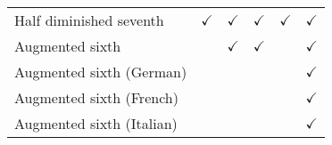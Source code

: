 \begin{tabular}{llllll}
Half diminished seventh   & $\checkmark$      & $\checkmark$                        & $\checkmark$                        & $\checkmark$                           & $\checkmark$                 \\
Augmented sixth           &         & $\checkmark$                        & $\checkmark$                        &                              &        $\checkmark$            \\
Augmented sixth (German)  &         &                           &                           &                              & $\checkmark$                 \\
Augmented sixth (French)  &         &                           &                           &                              & $\checkmark$                 \\
Augmented sixth (Italian) &         &                           &                           &                              & $\checkmark$                
\end{tabular}

